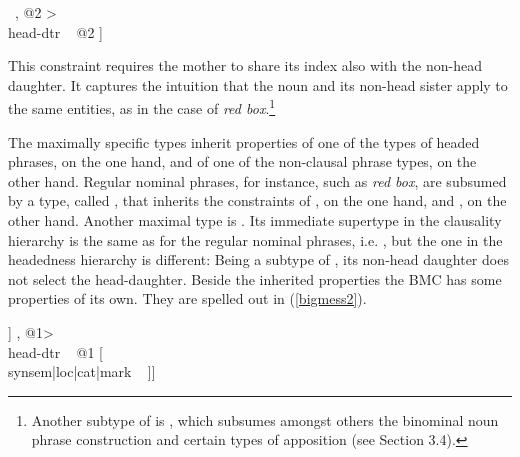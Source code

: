 \documentclass[output=paper]{langsci/langscibook}
\begin{document}
\begin{exe}
\ex\label{mononom} 
\begin{avm}
[\type{intersective-modification}                \\
 synsem|loc|content|index ~ @1 \type{index}      \\
 dtrs ~ <[synsem|loc|content|index ~ @1 ] ~, @2 > \\
 head-dtr ~ @2  ]
\end{avm}
\end{exe}

\noindent 
This constraint requires the mother to share its index also with the 
non-head daughter. It captures the intuition that the 
noun and its non-head sister apply to the same entities, as in 
the case of \emph{red box}.\footnote{Another subtype of  
is , which subsumes amongst others 
the binominal noun phrase construction and certain types of apposition
(see Section 3.4).}  

The maximally specific types inherit properties of one of the types of headed phrases,
on the one hand, and of one of the non-clausal phrase types, on the other hand.  
Regular nominal phrases, for instance, such as \emph{red box}, are subsumed 
by a type, called , that inherits the 
constraints of , on the one hand, and 
, on the other hand.  
Another maximal type is . 
Its immediate supertype in the {\sc clausality} hierarchy is the same 
as for the regular nominal phrases, i.e. , 
but the one in the {\sc headedness} hierarchy is different: 
Being a subtype of , 
its non-head daughter does not select the head-daughter. 
Beside the inherited properties the BMC has some properties of its own.   
They are spelled out in (\ref{bigmess2}).

\begin{exe}
\ex\label{bigmess2} 
\begin{avm}
[\type{big-mess-phr}                                    \\     
 dtrs ~ <[\type{hd-functor-phr}                         \\
          synsem|loc|cat [head ~ \type{adjective}       \\
                          mark ~ \type{marked} ]] , @1> \\
 head-dtr ~ @1 [              \\
                synsem|loc|cat|mark ~ ]]
\end{avm}
\end{exe}
\end{document}
